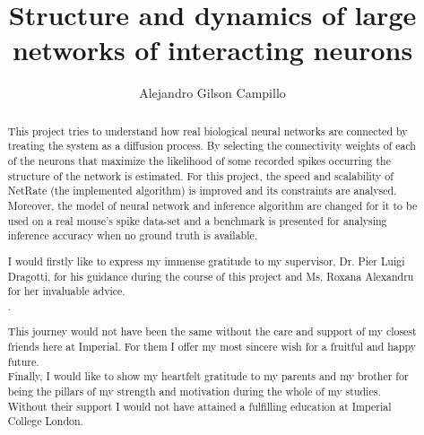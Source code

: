 \documentclass[a4paper, twoside]{report}
\title{Structure and dynamics of large networks of interacting neurons}
\author{Alejandro Gilson Campillo}
\begin{document}


\begin{abstract}
This project tries to understand how real biological neural networks are connected by treating the system as a diffusion process. By selecting the connectivity weights of each of the neurons that maximize the likelihood of some recorded spikes occurring  the structure of the network is estimated. For this project, the speed and scalability of NetRate (the implemented algorithm) is improved and its constraints are analysed. Moreover, the model of neural network and inference algorithm are changed for it to be used on a real mouse’s spike data-set and a benchmark is presented for analysing inference accuracy when no ground truth is available.
\end{abstract}

\renewcommand{\abstractname}{Acknowledgements}
\begin{abstract}
I would firstly like to express my immense gratitude to my supervisor, Dr. Pier Luigi Dragotti, for his guidance during the course of this project and Ms. Roxana Alexandru for her invaluable advice.\\.

This journey would not have been the same without the care and support of my closest friends here at Imperial. For them I offer my most sincere wish for a fruitful and happy future.\\

Finally, I would like to show my heartfelt gratitude to my parents and my brother for being the pillars of my strength and motivation during the whole of my studies. Without their support I would not have attained a fulfilling education at Imperial College London. 
\end{abstract}

\tableofcontents
\listoffigures
\listoftables











\printbibliography 
% 
% 
\end{document}

